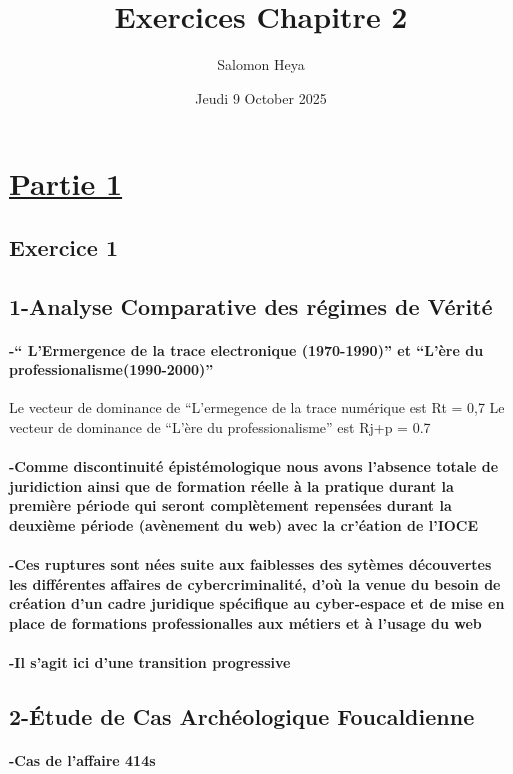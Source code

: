 \documentclass{article}
\title{Exercices Chapitre 2}
\author{Salomon Heya}
\date{Jeudi 9 October 2025}
\begin{document}
\section{\underline{Partie 1}}
\subsection{Exercice 1}

\subsection{1-Analyse Comparative des régimes de Vérité}
\paragraph{ -`` L'Ermergence de la trace electronique (1970-1990)'' et ``L'ère du  professionalisme(1990-2000)''}
Le vecteur de dominance de ``L'ermegence de la trace numérique est Rt = 0,7 \newline
Le vecteur de dominance de ``L'ère du professionalisme'' est Rj+p = 0.7

\paragraph{-Comme discontinuité épistémologique nous avons l'absence totale de juridiction ainsi que de formation réelle à la pratique durant la première période qui seront complètement repensées durant la deuxième période  (avènement du web)  avec la cr'éation de l'IOCE}
\paragraph{-Ces ruptures sont nées suite aux faiblesses des sytèmes découvertes les différentes affaires de cybercriminalité, d'où la venue du besoin de création d'un cadre juridique spécifique au cyber-espace et de mise en place de formations professionalles aux métiers et à l'usage du web}

\paragraph{-Il s'agit ici d'une transition progressive}

\subsection{2-Étude de Cas Archéologique Foucaldienne}
\paragraph{-Cas de l'affaire 414s}
\end{document}
